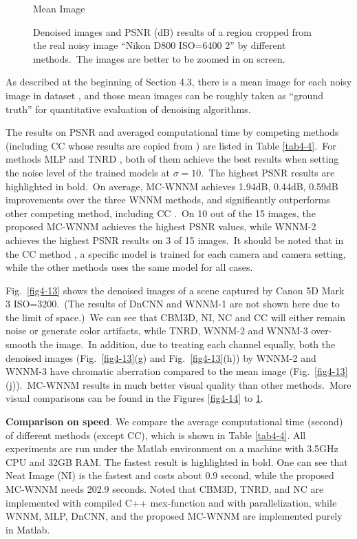 \begin{figure}
{\begin{minipage}[t]{0.19\textwidth}
{\footnotesize Mean Image }
\end{minipage}
}
    \caption{Denoised images and PSNR (dB) results of a region cropped from the real noisy image ``Nikon D800 ISO=6400 2'' \cite{crosschannel2016} by different methods.\ The images are better to be zoomed in on screen.}
    \label{fig4-17}
\end{figure}


\quad As described at the beginning of Section 4.3, there is a mean image for each noisy image in dataset \cite{crosschannel2016}, and those mean images can be roughly taken as ``ground truth'' for quantitative evaluation of denoising algorithms.

The results on PSNR and averaged computational time by competing methods (including CC \cite{crosschannel2016} whose results are copied from \cite{crosschannel2016}) are listed in Table \ref{tab4-4}.\ For methods MLP \cite{mlp} and TNRD \cite{tnrd}, both of them achieve the best results when setting the noise level of the trained models at $\sigma=10$.\ The highest PSNR results are highlighted in bold.\ On average, MC-WNNM achieves 1.94dB, 0.44dB, 0.59dB improvements over the three WNNM methods, and significantly outperforms other competing method, including CC \cite{crosschannel2016}.\ On 10 out of the 15 images, the proposed MC-WNNM achieves the highest PSNR values, while WNNM-2 achieves the highest PSNR results on 3 of 15 images.\ It should be noted that in the CC method \cite{crosschannel2016}, a specific model is trained for each camera and camera setting, while the other methods uses the same model for all cases. 

Fig.\ \ref{fig4-13} shows the denoised images of a scene captured by Canon 5D Mark 3 ISO=3200.\ (The results of DnCNN and WNNM-1 are not shown here due to the limit of space.)\ We can see that CBM3D, NI, NC and CC will either remain noise or generate color artifacts, while TNRD, WNNM-2 and WNNM-3 over-smooth the image.\ In addition, due to treating each channel equally, both the denoised images (Fig.\ \ref{fig4-13}(g) and Fig.\ \ref{fig4-13}(h)) by WNNM-2 and WNNM-3 have chromatic aberration compared to the mean image (Fig.\ \ref{fig4-13}(j)).\ MC-WNNM results in much better visual quality than other methods.\ More visual comparisons can be found in the Figures \ref{fig4-14} to \ref{fig4-17}.

\textbf{Comparison on speed}. We compare the average computational time (second) of different methods (except CC), which is shown in Table \ref{tab4-4}. All experiments are run under the Matlab environment on a machine with 3.5GHz CPU and 32GB RAM. The fastest result is highlighted in bold. One can see that Neat Image (NI) is the fastest and costs about 0.9 second, while the proposed MC-WNNM needs 202.9 seconds. Noted that CBM3D, TNRD, and NC are implemented with compiled C++ mex-function and with parallelization, while WNNM, MLP, DnCNN, and the proposed MC-WNNM are implemented purely in Matlab.


